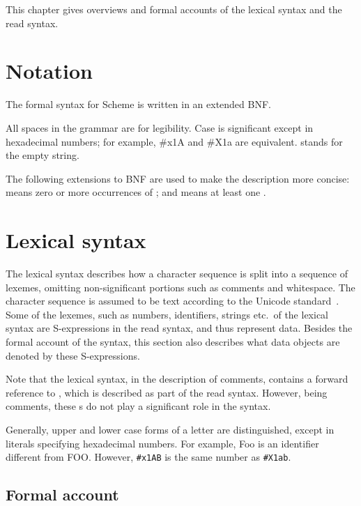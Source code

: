 This chapter gives overviews and formal accounts of the lexical
syntax and the read syntax.

\section{Notation}
\label{BNF}

The formal syntax for Scheme is written in an extended BNF.

All spaces in the grammar are for legibility.  Case is significant
except in hexadecimal numbers; for example, {\cf \#x1A} and {\cf
  \#X1a} are equivalent.   stands for the empty string.

The following extensions to BNF are used to make the description more
concise:   means zero or more occurrences of
; and  means at least one
.

\section{Lexical syntax}
\label{lexicalsyntaxsection}

The lexical syntax describes how a character sequence is split into a
sequence of lexemes, omitting non-significant portions
such as comments and whitespace.  The character sequence is assumed to
be text according to the Unicode standard~\cite{Unicode41}.  Some of
the lexemes, such as numbers, identifiers, strings etc.\ of the lexical
syntax are S-expressions in the read syntax, and thus represent data.
Besides the formal account of the syntax, this section also describes
what data objects are denoted by these S-expressions.

Note that the lexical syntax, in the description of comments, contains
a forward reference to , which is described as part of the
read syntax.  However, being comments, these s do not play
a significant role in the syntax.

Generally, upper and lower case forms of a letter are distinguished,
except in literals specifying hexadecimal numbers.  For example, {\cf
  Foo} is an identifier different from {\cf FOO}.  However,
{\tt\#x1AB} is the same number as {\tt\#X1ab}.

\subsection{Formal account}
\label{lexicalgrammarsection}

